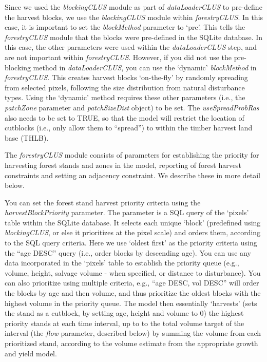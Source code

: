 \documentclass[
]{article}
\begin{document}
Since we used the \emph{blockingCLUS} module as part of
\emph{dataLoaderCLUS} to pre-define the harvest blocks, we use the
\emph{blockingCLUS} module within \emph{forestryCLUS}. In this case, it
is important to set the \emph{blockMethod} parameter to `pre'. This
tells the \emph{forestryCLUS} module that the blocks were pre-defined in
the SQLite database. In this case, the other parameters were used within
the \emph{dataLoaderCLUS} step, and are not important within
\emph{forestryCLUS}. However, if you did not use the pre-blocking method
in \emph{dataLoaderCLUS}, you can use the `dynamic' \emph{blockMethod}
in \emph{forestryCLUS}. This creates harvest blocks `on-the-fly' by
randomly spreading from selected pixels, following the size distribution
from natural disturbance types. Using the `dynamic' method requires
these other parameters (i.e., the \emph{patchZone} parameter and
\emph{patchSizeDist} object) to be set. The \emph{useSpreadProbRas} also
needs to be set to TRUE, so that the model will restrict the location of
cutblocks (i.e., only allow them to ``spread'') to within the timber
harvest land base (THLB).

The \emph{forestryCLUS} module consists of parameters for establishing
the priority for harvesting forest stands and zones in the model,
reporting of forest harvest constraints and setting an adjacency
constraint. We describe these in more detail below.

You can set the forest stand harvest priority criteria using the
\emph{harvestBlockPriority} parameter. The parameter is a SQL query of
the `pixels' table within the SQLite database. It selects each unique
`block' (predefined using \emph{blockingCLUS}, or else it prioritizes at
the pixel scale) and orders them, according to the SQL query criteria.
Here we use `oldest first' as the priority criteria using the ``age
DESC'' query (i.e., order blocks by descending age). You can use any
data incorporated in the `pixels' table to establish the priority queue
(e.g., volume, height, salvage volume - when specified, or distance to
disturbance). You can also prioritize using multiple criteria, e.g.,
``age DESC, vol DESC'' will order the blocks by age and then volume, and
thus prioritize the oldest blocks with the highest volume in the
priority queue. The model then essentially `harvests' (sets the stand as
a cutblock, by setting age, height and volume to 0) the highest priority
stands at each time interval, up to to the total volume target of the
interval (the \emph{flow} parameter, described below) by summing the
volume from each prioritized stand, according to the volume estimate
from the appropriate growth and yield model.
\end{document}
